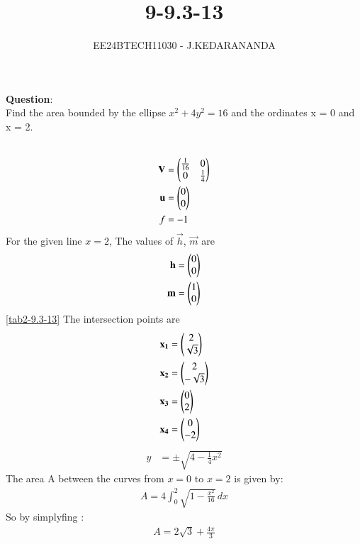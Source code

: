 \documentclass[journal]{IEEEtran}
\numberwithin{equation}{enumi}
\numberwithin{figure}{enumi}
\begin{document}

\title{9-9.3-13}
\author{EE24BTECH11030 - J.KEDARANANDA}
{\let\newpage\relax\maketitle}
\textbf{Question}:\\
Find the area bounded by the ellipse $x^2 + 4y^2 = 16$ and the ordinates x = 0 and x = 2.
\\
\solution \\
\begin{table}[h!]    
  \centering
  
  \caption{}
  \label{tab1-9.3-13}
\end{table}
\begin{table}[h!]    
  \centering
  
  \caption{}
  \label{tab2-9.3-13} 
\end{table}

\begin{align}
\mathbf{V}&=\begin{pmatrix}\frac{1}{16} & 0\\0 & \frac{1}{4}\end{pmatrix}\\
\mathbf{u}&=\begin{pmatrix}0\\0\end{pmatrix}\\
f&=-1
\end{align}
For the given line $x=2$, The values of $\vec{h}$, $\vec{m}$ are
\begin{align}
\mathbf{h}&=\begin{pmatrix}0\\0\end{pmatrix}\\
\mathbf{m}&=\begin{pmatrix}1\\0\end{pmatrix}
\end{align}
\ref{tab2-9.3-13}
The intersection points are
\begin{align}
\mathbf{x_1} &= \begin{pmatrix}2\\\sqrt{3}\end{pmatrix}\\
\mathbf{x_2} &= \begin{pmatrix}2\\-\sqrt{3}\end{pmatrix}\\
\mathbf{x_3} &= \begin{pmatrix}0\\2\end{pmatrix}\\
\mathbf{x_4} &= \begin{pmatrix}0\\-2\end{pmatrix}\\
\end{align}
\begin{align}
y &= \pm \sqrt{4 - \frac{1}{4}x^2}
\end{align}
The area A  between the curves from \( x = 0 \) to \( x = 2 \) is given by:
\begin{align}
A = 4 \int_0^2 \sqrt{1 - \frac{x^2}{16}} \, dx
\end{align}
So by simplyfing :
\begin{align}
A = 2\sqrt{3} + \frac{4\pi}{3}
\end{align}
\end{document}
